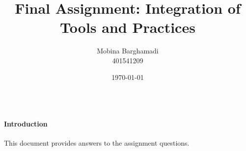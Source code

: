 \documentclass[a4paper,12pt]{article}
\title{\textbf{Final Assignment: Integration of Tools and Practices}}
\author{Mobina Barghamadi\\401541209}
\date{\today}
\begin{document}
\maketitle


\\\textbf{Introduction}
\\
\\This document provides answers to the assignment questions.

\clearpage
\end{document}
